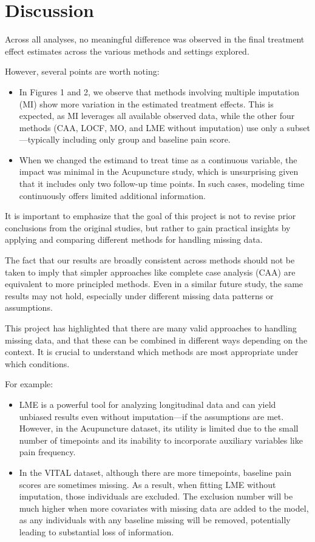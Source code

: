 \documentclass{article}
\begin{document}
\section{Discussion}\label{discussion}

Across all analyses, no meaningful difference was observed in the final
treatment effect estimates across the various methods and settings
explored.

However, several points are worth noting:

\begin{itemize}
\item
  In Figures 1 and 2, we observe that methods involving multiple
  imputation (MI) show more variation in the estimated treatment
  effects. This is expected, as MI leverages all available observed
  data, while the other four methods (CAA, LOCF, MO, and LME without
  imputation) use only a subset---typically including only group and
  baseline pain score.
\item
  When we changed the estimand to treat time as a continuous variable,
  the impact was minimal in the Acupuncture study, which is unsurprising
  given that it includes only two follow-up time points. In such cases,
  modeling time continuously offers limited additional information.
\end{itemize}

It is important to emphasize that the goal of this project is not to
revise prior conclusions from the original studies, but rather to gain
practical insights by applying and comparing different methods for
handling missing data.

The fact that our results are broadly consistent across methods should
not be taken to imply that simpler approaches like complete case
analysis (CAA) are equivalent to more principled methods. Even in a
similar future study, the same results may not hold, especially under
different missing data patterns or assumptions.

This project has highlighted that there are many valid approaches to
handling missing data, and that these can be combined in different ways
depending on the context. It is crucial to understand which methods are
most appropriate under which conditions.

For example:

\begin{itemize}
\item
  LME is a powerful tool for analyzing longitudinal data and can yield
  unbiased results even without imputation---if the assumptions are met.
  However, in the Acupuncture dataset, its utility is limited due to the
  small number of timepoints and its inability to incorporate auxiliary
  variables like pain frequency.
\item
  In the VITAL dataset, although there are more timepoints, baseline
  pain scores are sometimes missing. As a result, when fitting LME
  without imputation, those individuals are excluded. The exclusion
  number will be much higher when more covariates with missing data are
  added to the model, as any individuals with any baseline missing will
  be removed, potentially leading to substantial loss of information.
\end{itemize}
\end{document}
